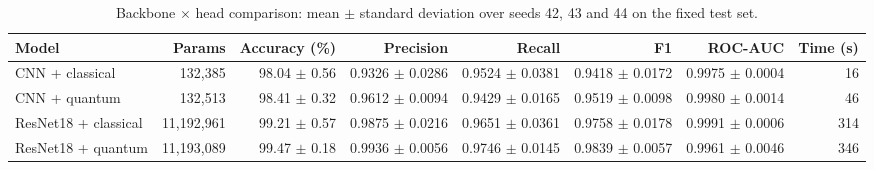 \begin{table}[htbp]
\centering
\footnotesize
\caption{Backbone $\times$ head comparison: mean $\pm$ standard deviation over seeds 42, 43 and 44 on the fixed test set.}
\label{tab:comparison}
\begin{adjustbox}{max width=\linewidth}
\begin{tabular}{lrrrrrrr}
\toprule
Model & Params & Accuracy (\%) & Precision & Recall & F1 & ROC-AUC & Time (s) \\
\midrule
CNN + classical & 132,385 & 98.04 $\pm$ 0.56 & 0.9326 $\pm$ 0.0286 & 0.9524 $\pm$ 0.0381 & 0.9418 $\pm$ 0.0172 & 0.9975 $\pm$ 0.0004 & 16 \\
CNN + quantum & 132,513 & 98.41 $\pm$ 0.32 & 0.9612 $\pm$ 0.0094 & 0.9429 $\pm$ 0.0165 & 0.9519 $\pm$ 0.0098 & 0.9980 $\pm$ 0.0014 & 46 \\
ResNet18 + classical & 11,192,961 & 99.21 $\pm$ 0.57 & 0.9875 $\pm$ 0.0216 & 0.9651 $\pm$ 0.0361 & 0.9758 $\pm$ 0.0178 & 0.9991 $\pm$ 0.0006 & 314 \\
ResNet18 + quantum & 11,193,089 & 99.47 $\pm$ 0.18 & 0.9936 $\pm$ 0.0056 & 0.9746 $\pm$ 0.0145 & 0.9839 $\pm$ 0.0057 & 0.9961 $\pm$ 0.0046 & 346 \\
\bottomrule
\end{tabular}
\end{adjustbox}
\end{table}
